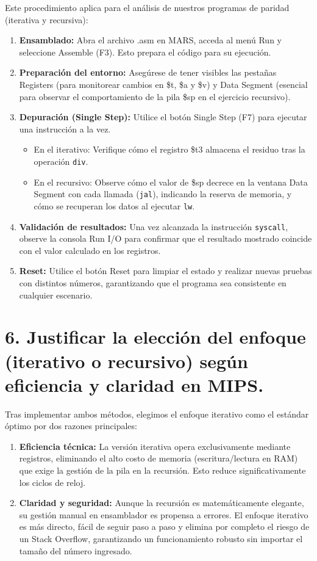 \documentclass[12pt]{article}
\begin{document}
Este procedimiento aplica para el análisis de nuestros programas de paridad (iterativa y recursiva):

\begin{enumerate}
    \item \textbf{Ensamblado:} Abra el archivo .asm en MARS, acceda al menú Run y seleccione Assemble (F3). Esto prepara el código para su ejecución.
    \item \textbf{Preparación del entorno:} Asegúrese de tener visibles las pestañas Registers (para monitorear cambios en \$t, \$a y \$v) y Data Segment (esencial para observar el comportamiento de la pila \$sp en el ejercicio recursivo).
    \item \textbf{Depuración (Single Step):} Utilice el botón Single Step (F7) para ejecutar una instrucción a la vez.
    \begin{itemize}
        \item En el iterativo: Verifique cómo el registro \$t3 almacena el residuo tras la operación \texttt{div}.
        \item En el recursivo: Observe cómo el valor de \$sp decrece en la ventana Data Segment con cada llamada (\texttt{jal}), indicando la reserva de memoria, y cómo se recuperan los datos al ejecutar \texttt{lw}.
    \end{itemize}
    \item \textbf{Validación de resultados:} Una vez alcanzada la instrucción \texttt{syscall}, observe la consola Run I/O para confirmar que el resultado mostrado coincide con el valor calculado en los registros.
    \item \textbf{Reset:} Utilice el botón Reset para limpiar el estado y realizar nuevas pruebas con distintos números, garantizando que el programa sea consistente en cualquier escenario.
\end{enumerate}

\section*{6. Justificar la elección del enfoque (iterativo o recursivo) según eficiencia y claridad en MIPS.}

Tras implementar ambos métodos, elegimos el enfoque iterativo como el estándar óptimo por dos razones principales:

\begin{enumerate}
    \item \textbf{Eficiencia técnica:} La versión iterativa opera exclusivamente mediante registros, eliminando el alto costo de memoria (escritura/lectura en RAM) que exige la gestión de la pila en la recursión. Esto reduce significativamente los ciclos de reloj.
    \item \textbf{Claridad y seguridad:} Aunque la recursión es matemáticamente elegante, su gestión manual en ensamblador es propensa a errores. El enfoque iterativo es más directo, fácil de seguir paso a paso y elimina por completo el riesgo de un Stack Overflow, garantizando un funcionamiento robusto sin importar el tamaño del número ingresado.
\end{enumerate}
\end{document}

